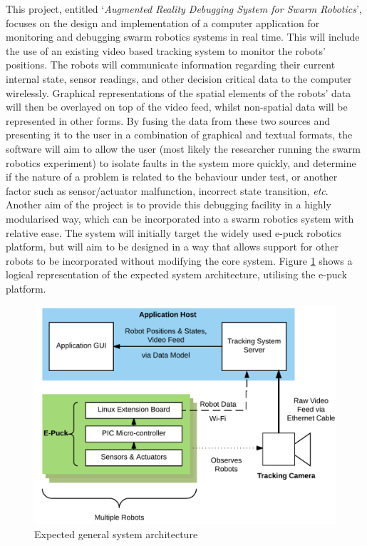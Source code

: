 \documentclass[titlepage,hidelinks,10pt]{article}
\begin{document}
This project, entitled `\textit{Augmented Reality Debugging System for Swarm Robotics}', focuses on the design and implementation of a computer application for monitoring and debugging swarm robotics systems in real time. This will include the use of an existing video based tracking system to monitor the robots' positions. The robots will communicate information regarding their current internal state, sensor readings, and other decision critical data to the computer wirelessly. Graphical representations of the spatial elements of the robots' data will then be overlayed on top of the video feed, whilst non-spatial data will be represented in other forms. By fusing the data from these two sources and presenting it to the user in a combination of graphical and textual formats, the software will aim to allow the user (most likely the researcher running the swarm robotics experiment) to isolate faults in the system more quickly, and determine if the nature of a problem is related to the behaviour under test, or another factor such as sensor/actuator malfunction, incorrect state transition, \textit{etc}. Another aim of the project is to provide this debugging facility in a highly modularised way, which can be incorporated into a swarm robotics system with relative ease. The system will initially target the widely used e-puck\cite{EPuck} robotics platform, but will aim to be designed in a way that allows support for other robots to be incorporated without modifying the core system. Figure \ref{fig:SystemArchitecture} shows a logical representation of the expected system architecture, utilising the e-puck platform.

\begin{figure}[H]
	\begin{center}
	\includegraphics[scale=0.8]{SystemArchitecture.png}
	\caption{Expected general system architecture}
	\label{fig:SystemArchitecture}
	\end{center}
\end{figure}
\end{document}
